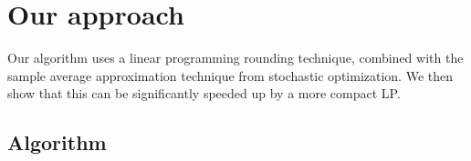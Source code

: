 
\section{Our approach}
\label{sec:method}

Our algorithm \algo{} uses a linear programming rounding technique, combined with the sample average approximation
technique from stochastic optimization. We then show that this can be significantly speeded up by a more compact LP.

\subsection{Algorithm \algo{}}



